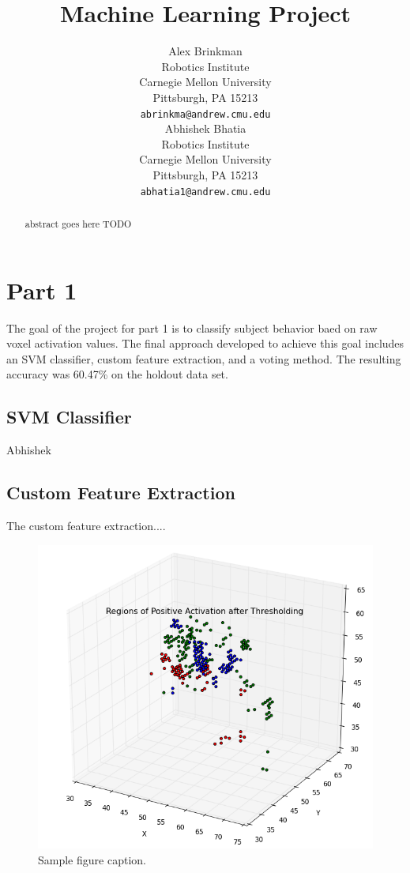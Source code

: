 \documentclass{article} %
\title{Machine Learning Project}
\author{
Alex Brinkman\\
Robotics Institute\\
Carnegie Mellon University\\
Pittsburgh, PA 15213 \\
\texttt{abrinkma@andrew.cmu.edu} \\
\And
Abhishek Bhatia \\
Robotics Institute \\
Carnegie Mellon University\\
Pittsburgh, PA 15213 \\
\texttt{abhatia1@andrew.cmu.edu} \\
}
\begin{document}
\maketitle

\begin{abstract}
abstract goes here TODO

\end{abstract}

\section{Part 1}
The goal of the project for part 1 is to classify subject behavior baed on raw voxel activation values.  The final approach developed to achieve this goal includes an SVM classifier, custom feature extraction, and a voting method. The resulting accuracy was 60.47\% on the holdout data set.

\subsection{SVM Classifier}
Abhishek

\subsection{Custom Feature Extraction}
The custom feature extraction....

\begin{figure}[H]
\begin{center}
\includegraphics[scale=.4]{media/pos_activation_formatted.png}
\end{center}
\caption{Sample figure caption.}
\end{figure}
\end{document}
